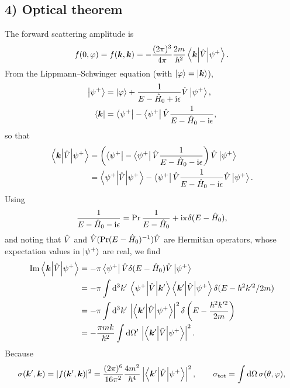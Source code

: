 \subsection*{4) Optical theorem}
The forward scattering amplitude is
\begin{equation}
f(0,\varphi)=f(\bm{k},\bm{k})=-\frac{(2\pi)^3}{4\pi}\frac{2m}{\hbar^2}
\left\langle\bm{k}\middle|\hat{V}\middle|\psi^+\right\rangle.
\end{equation}
From the Lippmann--Schwinger equation (with $\left|\varphi\right\rangle=\left|\bm{k}\right\rangle$),
\begin{equation}\begin{aligned}
\left|\psi^+\right\rangle&=\left|\varphi\right\rangle+\frac1{E-\hat{H}_0+\mathrm{i}\epsilon}\hat{V}\left|\psi^+\right\rangle,\\
\left\langle\bm{k}\right|&=\left\langle\psi^+\right|-\left\langle\psi^+\right|\hat{V}
\frac1{E-\hat{H}_0-\mathrm{i}\epsilon},
\end{aligned}\end{equation}
so that
\begin{equation}\begin{aligned}
\left\langle\bm{k}\middle|\hat{V}\middle|\psi^+\right\rangle
&=\left(\left\langle\psi^+\right|-\left\langle\psi^+\right|\hat{V}\frac1{E-\hat{H}_0-\mathrm{i}\epsilon}\right)\hat{V}\left|\psi^+\right\rangle\\
&=\left\langle\psi^+\middle|\hat{V}\middle|\psi^+\right\rangle
-\left\langle\psi^+\right|\hat{V}\frac1{E-\hat{H}_0-\mathrm{i}\epsilon}\hat{V}\left|\psi^+\right\rangle.
\end{aligned}\end{equation}
Using
\begin{equation}
\frac1{E-\hat{H}_0-\mathrm{i}\epsilon}
=\operatorname{Pr}\frac1{E-\hat{H}_0}+\mathrm{i}\pi\delta(E-\hat{H}_0),
\end{equation}
and noting that $\hat{V}$ and $\hat{V}(\operatorname{Pr}(E-\hat{H}_0)^{-1})\hat{V}$ are Hermitian operators, whose expectation values in $\left|\psi^+\right\rangle$ are real, we find
\begin{equation}\begin{aligned}
\operatorname{Im}\left\langle\bm{k}\middle|\hat{V}\middle|\psi^+\right\rangle
&=-\pi\left\langle\psi^+\right|\hat{V}\delta(E-\hat{H}_0)\hat{V}\left|\psi^+\right\rangle\\
&=-\pi\int\mathrm{d}^3k'\,
\left\langle\psi^+\middle|\hat{V}\middle|\bm{k}'\right\rangle\left\langle\bm{k}'\middle|\hat{V}\middle|\psi^+\right\rangle
\delta(E-\hbar^2k'^2/2m)\\
&=-\pi\int\mathrm{d}^3k'\,
\left|\left\langle\bm{k}'\middle|\hat{V}\middle|\psi^+\right\rangle\right|^2
\delta\left(E-\frac{\hbar^2k'^2}{2m}\right)\\
&=-\frac{\pi m k}{\hbar^2}\int\mathrm{d}\Omega'\,
\left|\left\langle\bm{k}'\middle|\hat{V}\middle|\psi^+\right\rangle\right|^2.
\end{aligned}\end{equation}
Because
\begin{equation}
\sigma(\bm{k}',\bm{k})=|f(\bm{k}',\bm{k})|^2
=\frac{(2\pi)^6}{16\pi^2}\frac{4m^2}{\hbar^4}
\left|\left\langle\bm{k}'\middle|\hat{V}\middle|\psi^+\right\rangle\right|^2,\qquad
\sigma_{\mathrm{tot}}=\int\mathrm{d}\Omega\,\sigma(\theta,\varphi),
\end{equation}
